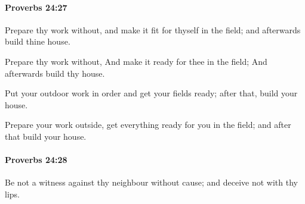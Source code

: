 		\paragraph{Proverbs 24:27} %
			\label{PROVERBS-24-27}

			Prepare thy work without, and make it fit for thyself in the field; and afterwards build thine house.

			\begin{versebox}
					\item[BHS] 
					\item[ASV] Prepare thy work without, And make it ready for thee in the field; And afterwards build thy house.
					\item[NIV] Put your outdoor work in order and get your fields ready; after that, build your house.
					\item[NRSV] Prepare your work outside, get everything ready for you in the field; and after that build your house.
			\end{versebox}

		\paragraph{Proverbs 24:28} %
			\label{PROVERBS-24-28}

			Be not a witness against thy neighbour without cause; and deceive not with thy lips.

